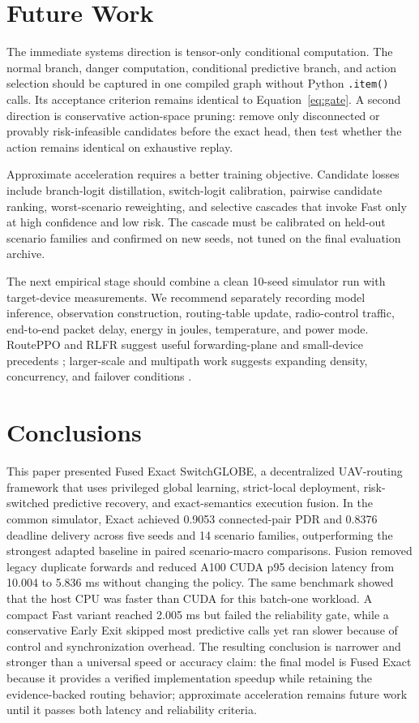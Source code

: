\documentclass[drones,article,submit,moreauthors]{Definitions/mdpi}
\newcommand{\FSG}{Fused Exact SwitchGLOBE}
\newcommand{\VerifyEdit}[1]{\textcolor{ReviewBlue}{#1}}
\begin{document}
\section{Future Work}

The immediate systems direction is tensor-only conditional computation. The normal branch, danger computation, conditional predictive branch, and action selection should be captured in one compiled graph without Python \texttt{.item()} calls. Its acceptance criterion remains identical to Equation~\eqref{eq:gate}. A second direction is conservative action-space pruning: remove only disconnected or provably risk-infeasible candidates before the exact head, then test whether the action remains identical on exhaustive replay.

Approximate acceleration requires a better training objective. Candidate losses include branch-logit distillation, switch-logit calibration, pairwise candidate ranking, worst-scenario reweighting, and selective cascades that invoke Fast only at high confidence and low risk. The cascade must be calibrated on held-out scenario families and confirmed on new seeds, not tuned on the final evaluation archive.

The next empirical stage should combine a clean 10-seed simulator run with target-device measurements. We recommend separately recording model inference, observation construction, routing-table update, radio-control traffic, end-to-end packet delay, energy in joules, temperature, and power mode. RoutePPO and RLFR suggest useful forwarding-plane and small-device precedents \cite{curmen2026routeppo,li2024rlfr}; larger-scale and multipath work suggests expanding density, concurrency, and failover conditions \cite{zhang2026large,zhao2026multipath}.

\section{Conclusions}

\VerifyEdit{This paper presented \FSG{}, a decentralized UAV-routing framework that uses privileged global learning, strict-local deployment, risk-switched predictive recovery, and exact-semantics execution fusion. In the common simulator, Exact achieved 0.9053 connected-pair PDR and 0.8376 deadline delivery across five seeds and 14 scenario families, outperforming the strongest adapted baseline in paired scenario-macro comparisons. Fusion removed legacy duplicate forwards and reduced A100 CUDA p95 decision latency from 10.004 to 5.836 ms without changing the policy. The same benchmark showed that the host CPU was faster than CUDA for this batch-one workload. A compact Fast variant reached 2.005 ms but failed the reliability gate, while a conservative Early Exit skipped most predictive calls yet ran slower because of control and synchronization overhead.} The resulting conclusion is narrower and stronger than a universal speed or accuracy claim: the final model is Fused Exact because it provides a verified implementation speedup while retaining the evidence-backed routing behavior; approximate acceleration remains future work until it passes both latency and reliability criteria.
\end{document}
